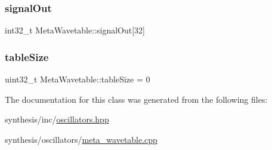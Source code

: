 \mbox{\label{class_meta_wavetable_a7794d98f59ddc333a8f3489bfd102558}} 
\subsubsection{\texorpdfstring{signal\+Out}{signalOut}}
{\footnotesize\ttfamily int32\+\_\+t Meta\+Wavetable\+::signal\+Out\mbox{[}32\mbox{]}}

\mbox{\label{class_meta_wavetable_aacf77c49de6338ed07e3dc6c0fa743e4}} 
\subsubsection{\texorpdfstring{table\+Size}{tableSize}}
{\footnotesize\ttfamily uint32\+\_\+t Meta\+Wavetable\+::table\+Size = 0}



The documentation for this class was generated from the following files\+:\begin{DoxyCompactItemize}
\item 
synthesis/inc/\mbox{\hyperlink{oscillators_8hpp}{oscillators.\+hpp}}\item 
synthesis/oscillators/\mbox{\hyperlink{meta__wavetable_8cpp}{meta\+\_\+wavetable.\+cpp}}\end{DoxyCompactItemize}
